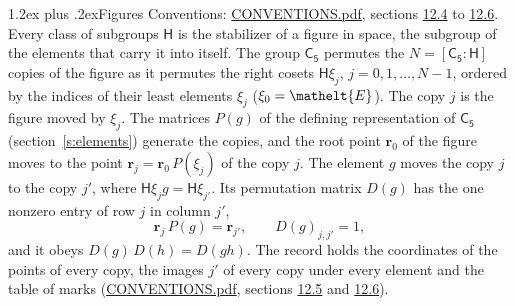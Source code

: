 \documentclass[10pt,a4paper]{article}
\makeatletter
\renewcommand\section{\@startsection{section}{1}{\z@}{-3ex plus -1ex minus -.2ex}%
  {1.2ex plus .2ex}{\normalfont\large\sffamily\bfseries\color{parttitle}}}
\numberwithin{equation}{section}
\newcommand{\eltfont}[1]{{\let\sigma\eltsigma\mathelt{#1}}}
\newcommand{\grp}[1]{\mathsf{#1}}
\newcommand{\cls}[1]{\eltfont{#1}}
\newcommand{\pointr}{\mathbf{r}}
\makeatother
\begin{document}
\section{Figures}\label{s:permutation}
Conventions: \href{../../CONVENTIONS.pdf}{CONVENTIONS.pdf}, sections \href{../../CONVENTIONS.pdf\#conv.12.4}{12.4} to \href{../../CONVENTIONS.pdf\#conv.12.6}{12.6}.
Every class of subgroups $\grp{H}$ is the stabilizer of a figure in space, the subgroup of the elements that carry it into itself. \label{n:local.orbit.size}\label{n:element.coset.least}\label{n:index.coset}The group $\grp{C_{5}}$ permutes the $N = [\grp{C_{5}} : \grp{H}]$ copies of the figure as it permutes the right cosets $\grp{H}\xi_j$, $j = 0, 1, \dots, N - 1$, ordered by the indices of their least elements $\xi_j$ ($\xi_0 = \cls{E}$). The copy $j$ is the figure moved by $\xi_j$. The matrices $P(g)$ of the defining representation of $\grp{C_{5}}$ (section~\ref{s:elements}) generate the copies, and the root point $\pointr_0$ of the figure moves to the point $\pointr_j = \pointr_0\, P(\xi_j)$ of the copy $j$. \label{n:local.coset.image}The element $g$ moves the copy $j$ to the copy $j'$, where $\grp{H}\xi_j g = \grp{H}\xi_{j'}$. \label{n:local.matrix.permutation}Its permutation matrix $D(g)$ has the one nonzero entry of row $j$ in column $j'$,
\begin{equation}\label{e:perm.matrix}\pointr_j\, P(g) = \pointr_{j'}, \qquad D(g)_{j,j'} = 1,\end{equation}
and it obeys $D(g)\, D(h) = D(gh)$. The record holds the coordinates of the points of every copy, the images $j'$ of every copy under every element and the table of marks (\href{../../CONVENTIONS.pdf}{CONVENTIONS.pdf}, sections \href{../../CONVENTIONS.pdf\#conv.12.5}{12.5} and \href{../../CONVENTIONS.pdf\#conv.12.6}{12.6}).
\end{document}
